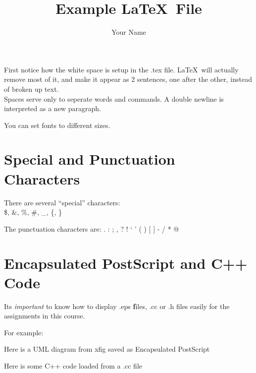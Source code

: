 \documentclass{article}[12pt]		    %
\title{Example \LaTeX\ File}
\author{Your Name}
\begin{document}
\maketitle		%

First notice 
how the white    space       is	    setup in the .tex file.  
\LaTeX\ will actually remove most of it, and 
make it appear 
as 2 sentences, one after the other, instead of broken up text. \\  %

Spaces serve only to seperate words and commands.  A double newline is interpreted as a new paragraph.

\tiny{You} \scriptsize{can} \small{set} \normalsize{fonts} \large{to} \Large{different} \LARGE{sizes}\normalsize{.}

\section*{Special and Punctuation Characters}

There are several ``special'' characters: \\ \$, \&, \%, \#, \_, \{, \}  

The punctuation characters are: . : ; , ? ! ` ' ( ) [ ] - / * @

\section{Encapsulated PostScript and C++ Code}
Its \emph{important} to know how to display .eps {\textbf files}, .cc or .h files 
easily for the assignments in this course.
 
For example:

\begin{center}
    Here is a UML diagram from xfig saved as Encapsulated PostScript
    
\end{center}

Here is some C++ code loaded from a .cc file

\end{document}

